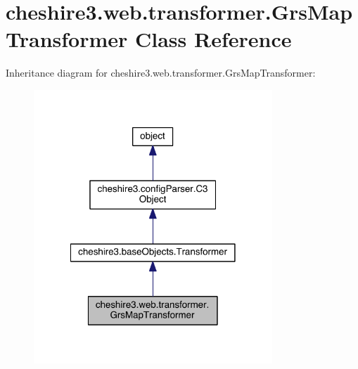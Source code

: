 \hypertarget{classcheshire3_1_1web_1_1transformer_1_1_grs_map_transformer}{\section{cheshire3.\-web.\-transformer.\-Grs\-Map\-Transformer Class Reference}
\label{classcheshire3_1_1web_1_1transformer_1_1_grs_map_transformer}
}


Inheritance diagram for cheshire3.\-web.\-transformer.\-Grs\-Map\-Transformer\-:
\nopagebreak
\begin{figure}[H]
\begin{center}
\leavevmode
\includegraphics[width=254pt]{classcheshire3_1_1web_1_1transformer_1_1_grs_map_transformer__inherit__graph}
\end{center}
\end{figure}


